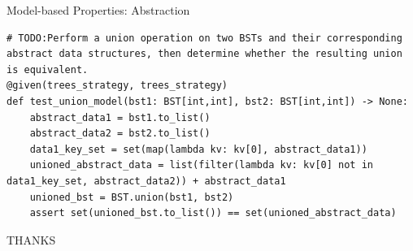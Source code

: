 \documentclass{beamer}
\begin{document}
\begin{frame}{Model-based Properties: Abstraction}
    \begin{lstlisting}
# TODO:Perform a union operation on two BSTs and their corresponding abstract data structures, then determine whether the resulting union is equivalent.
@given(trees_strategy, trees_strategy)
def test_union_model(bst1: BST[int,int], bst2: BST[int,int]) -> None:
    abstract_data1 = bst1.to_list()
    abstract_data2 = bst2.to_list()
    data1_key_set = set(map(lambda kv: kv[0], abstract_data1))
    unioned_abstract_data = list(filter(lambda kv: kv[0] not in data1_key_set, abstract_data2)) + abstract_data1
    unioned_bst = BST.union(bst1, bst2)
    assert set(unioned_bst.to_list()) == set(unioned_abstract_data)
    \end{lstlisting}
\end{frame}

\begin{frame}
\begin{center}
    \huge THANKS
\end{center}
\end{frame}
\end{document}
